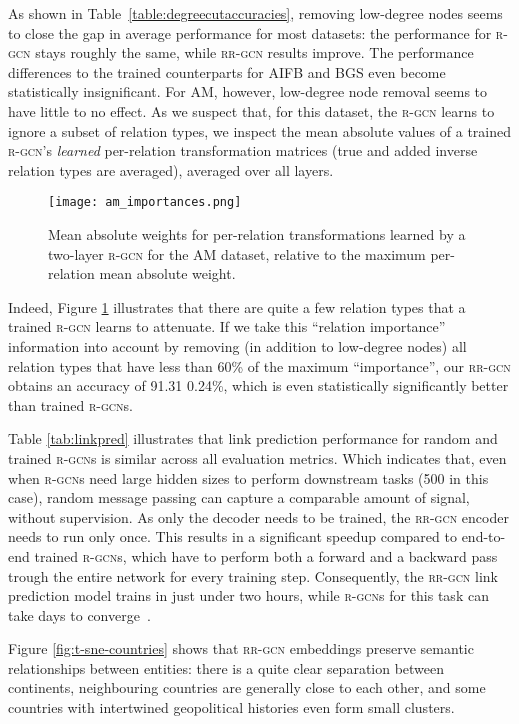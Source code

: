 \documentclass{llncs}
\begin{document}
As shown in Table~\ref{table:degreecutaccuracies}, removing low-degree nodes seems to close the gap in average performance for most datasets: the performance for \textsc{r-gcn} stays roughly the same, while \textsc{rr-gcn} results improve. The performance differences to the trained counterparts for AIFB and BGS even become statistically insignificant. For AM, however, low-degree node removal seems to have little to no effect. As we suspect that, for this dataset, the \textsc{r-gcn} learns to ignore a subset of relation types, we inspect the mean absolute values of a trained \textsc{r-gcn}'s \textit{learned} per-relation transformation matrices (true and added inverse relation types are averaged), averaged over all layers. 
\begin{figure}[t]
    \centering
    \texttt{[image: am\_importances.png]}
    \caption{Mean absolute weights for per-relation transformations learned by a two-layer \textsc{r-gcn} for the AM dataset, relative to the maximum per-relation mean absolute weight.}
    \label{fig:amimportances}
\end{figure}
Indeed, Figure \ref{fig:amimportances} illustrates that there are quite a few relation types that a trained \textsc{r-gcn} learns to attenuate. If we take this ``relation importance'' information into account by removing (in addition to low-degree nodes) all relation types that have less than 60\% of the maximum ``importance'', our \textsc{rr-gcn} obtains an accuracy of 91.31  0.24\%, which is even statistically significantly better than trained \textsc{r-gcn}s.

Table \ref{tab:linkpred} illustrates that link prediction performance for random and trained \textsc{r-gcn}s is similar across all evaluation metrics. Which indicates that, even when \textsc{r-gcn}s need large hidden sizes to perform downstream tasks (500 in this case), random message passing can capture a comparable amount of signal, without supervision. As only the decoder needs to be trained, the \textsc{rr-gcn} encoder needs to run only once. This results in a significant speedup compared to end-to-end trained \textsc{r-gcn}s, which have to perform both a forward and a backward pass trough the entire network for every training step. Consequently, the \textsc{rr-gcn} link prediction model trains in just under two hours, while \textsc{r-gcn}s for this task can take days to converge~\cite{thanapalasingam2021relational}.

Figure \ref{fig:t-sne-countries} shows that \textsc{rr-gcn} embeddings preserve semantic relationships between entities: there is a quite clear separation between continents, neighbouring countries are generally close to each other, and some countries with intertwined geopolitical histories even form small clusters.
\end{document}
